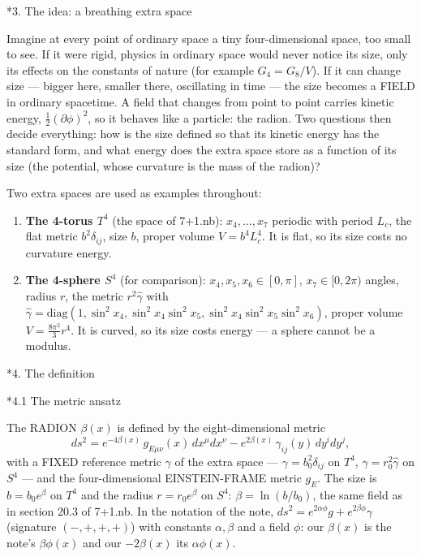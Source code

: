 \documentclass[10pt,a4paper]{article}
\makeatletter
\renewcommand\section{\@startsection{section}{1}{\z@}{-3.5ex \@plus -1ex \@minus -.2ex}{2.3ex \@plus.2ex}{\normalfont\Large\bfseries\raggedright}}
\renewcommand\subsection{\@startsection{subsection}{2}{\z@}{-3.25ex\@plus -1ex \@minus -.2ex}{1.5ex \@plus .2ex}{\normalfont\large\bfseries\raggedright}}
\makeatother
\begin{document}
\section*{3. The idea: a breathing extra space}
Imagine at every point of ordinary space a tiny four-dimensional space, too small to see. If it were rigid, physics in ordinary space would never notice its size, only its effects on the constants of nature (for example $G_4=G_8/V$). If it can change size — bigger here, smaller there, oscillating in time — the size becomes a FIELD in ordinary spacetime. A field that changes from point to point carries kinetic energy, $\frac12(\partial\phi)^2$, so it behaves like a particle: the radion. Two questions then decide everything: how is the size defined so that its kinetic energy has the standard form, and what energy does the extra space store as a function of its size (the potential, whose curvature is the mass of the radion)?

Two extra spaces are used as examples throughout:

\begin{enumerate}
\item \textbf{The 4-torus $T^4$} (the space of 7+1.nb): $x_4,\dots,x_7$ periodic with period $L_c$, the flat metric $b^2\delta_{ij}$, size $b$, proper volume $V=b^4L_c^4$. It is flat, so its size costs no curvature energy.
\item \textbf{The 4-sphere $S^4$} (for comparison): $x_4,x_5,x_6\in[0,\pi]$, $x_7\in[0,2\pi)$ angles, radius $r$, the metric $r^2\hat\gamma$ with $\hat\gamma=\mathrm{diag}(1,\sin^2x_4,\sin^2x_4\sin^2x_5,\sin^2x_4\sin^2x_5\sin^2x_6)$, proper volume $V=\frac{8\pi^2}3r^4$. It is curved, so its size costs energy — a sphere cannot be a modulus.
\end{enumerate}
\section*{4. The definition}
\subsection*{4.1 The metric ansatz}
The RADION $\beta(x)$ is defined by the eight-dimensional metric
\begin{equation*}
ds^2=e^{-4\beta(x)}\,g_{E\mu\nu}(x)\,dx^\mu dx^\nu-e^{2\beta(x)}\,\gamma_{ij}(y)\,dy^idy^j,
\end{equation*}
with a FIXED reference metric $\gamma$ of the extra space — $\gamma=b_0^2\delta_{ij}$ on $T^4$, $\gamma=r_0^2\hat\gamma$ on $S^4$ — and the four-dimensional EINSTEIN-FRAME metric $g_E$. The size is $b=b_0e^\beta$ on $T^4$ and the radius $r=r_0e^\beta$ on $S^4$: $\beta=\ln(b/b_0)$, the same field as in section 20.3 of 7+1.nb. In the notation of the note, $ds^2=e^{2\alpha\phi}g+e^{2\beta\phi}\gamma$ (signature $(-,+,+,+)$) with constants $\alpha,\beta$ and a field $\phi$: our $\beta(x)$ is the note’s $\beta\phi(x)$ and our $-2\beta(x)$ its $\alpha\phi(x)$.
\end{document}

